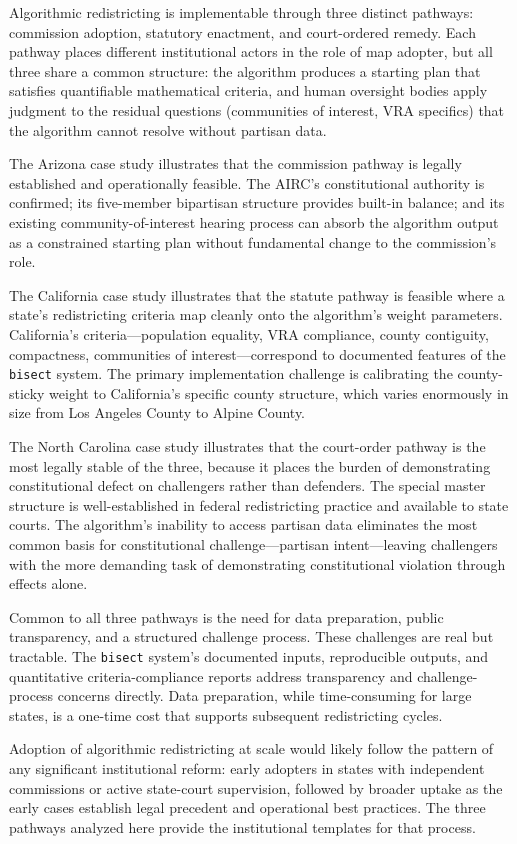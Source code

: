 \label{sec:conclusion}

Algorithmic redistricting is implementable through three distinct pathways:
commission adoption, statutory enactment, and court-ordered remedy.  Each
pathway places different institutional actors in the role of map adopter, but
all three share a common structure: the algorithm produces a starting plan
that satisfies quantifiable mathematical criteria, and human oversight bodies
apply judgment to the residual questions (communities of interest, VRA
specifics) that the algorithm cannot resolve without partisan data.

The Arizona case study illustrates that the commission pathway is legally
established and operationally feasible.  The AIRC's constitutional authority
is confirmed; its five-member bipartisan structure provides built-in balance;
and its existing community-of-interest hearing process can absorb the algorithm
output as a constrained starting plan without fundamental change to the
commission's role.

The California case study illustrates that the statute pathway is feasible
where a state's redistricting criteria map cleanly onto the algorithm's weight
parameters.  California's criteria---population equality, VRA compliance, county
contiguity, compactness, communities of interest---correspond to documented
features of the \texttt{bisect} system.  The primary implementation challenge
is calibrating the county-sticky weight to California's specific county
structure, which varies enormously in size from Los Angeles County to
Alpine County.

The North Carolina case study illustrates that the court-order pathway is the
most legally stable of the three, because it places the burden of demonstrating
constitutional defect on challengers rather than defenders.  The special master
structure is well-established in federal redistricting practice and available
to state courts.  The algorithm's inability to access partisan data eliminates
the most common basis for constitutional challenge---partisan intent---leaving
challengers with the more demanding task of demonstrating constitutional
violation through effects alone.

Common to all three pathways is the need for data preparation, public
transparency, and a structured challenge process.  These challenges are
real but tractable.  The \texttt{bisect} system's documented inputs, reproducible
outputs, and quantitative criteria-compliance reports address transparency and
challenge-process concerns directly.  Data preparation, while time-consuming
for large states, is a one-time cost that supports subsequent redistricting
cycles.

Adoption of algorithmic redistricting at scale would likely follow the pattern
of any significant institutional reform: early adopters in states with
independent commissions or active state-court supervision, followed by
broader uptake as the early cases establish legal precedent and operational
best practices.  The three pathways analyzed here provide the institutional
templates for that process.
